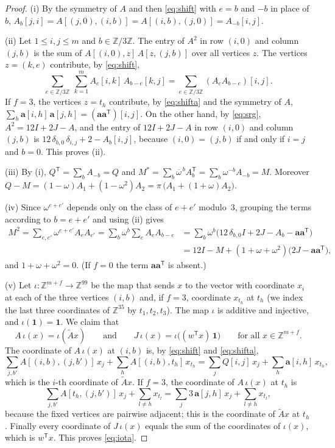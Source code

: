 \documentclass[11pt,a4paper]{article}
\theoremstyle{remark}
\newcommand{\ZZ}{\mathbb{Z}}
\newcommand{\one}{\mathbf{1}}
\newcommand{\tp}{\mathsf{T}}
\newcommand{\av}{\mathbf{a}}
\newcommand{\tA}{\widetilde{A}}
\begin{document}
\begin{proof}
(i) By the symmetry of $A$ and then \eqref{eq:shift} with $e=b$ and $-b$ in place of $b$,
$A_b[j,i]=A[(j,0),(i,b)]=A[(i,b),(j,0)]=A_{-b}[i,j]$.

(ii) Let $1\le i,j\le m$ and $b\in\ZZ/3\ZZ$. The entry of $A^2$ in row $(i,0)$ and column $(j,b)$ is the sum of
$A[(i,0),z]\,A[z,(j,b)]$ over all vertices $z$. The vertices $z=(k,e)$ contribute, by \eqref{eq:shift},
\[
\sum_{e\in\ZZ/3\ZZ}\ \sum_{k=1}^{m}A_e[i,k]\,A_{b-e}[k,j]=\sum_{e\in\ZZ/3\ZZ}(A_eA_{b-e})[i,j] .
\]
If $f=3$, the vertices $z=t_h$ contribute, by \eqref{eq:shifta} and the symmetry of $A$,
$\sum_{h}\av[i,h]\,\av[j,h]=(\av\av^{\tp})[i,j]$. On the other hand, by \eqref{eq:srg}, $A^2=12I+2J-A$, and the entry
of $12I+2J-A$ in row $(i,0)$ and column $(j,b)$ is $12\,\delta_{b,0}\,\delta_{i,j}+2-A_b[i,j]$, because
$(i,0)=(j,b)$ if and only if $i=j$ and $b=0$. This proves (ii).

(iii) By (i), $Q^{\tp}=\sum_bA_{-b}=Q$ and
$M^*=\sum_b\overline{\omega}^{\,b}A_b^{\tp}=\sum_b\omega^{-b}A_{-b}=M$. Moreover
$Q-M=(1-\omega)A_1+(1-\omega^2)A_2=\pi\,\bigl(A_1+(1+\omega)A_2\bigr)$.

(iv) Since $\omega^{e+e'}$ depends only on the class of $e+e'$ modulo~3, grouping the terms according to $b=e+e'$
and using (ii) gives
\begin{align*}
M^2=\sum_{e,e'}\omega^{e+e'}A_eA_{e'}=\sum_{b}\omega^{b}\sum_{e}A_eA_{b-e}
&=\sum_b\omega^b\bigl(12\,\delta_{b,0}I+2J-A_b-\av\av^{\tp}\bigr)\\
&=12I-M+(1+\omega+\omega^2)\bigl(2J-\av\av^{\tp}\bigr),
\end{align*}
and $1+\omega+\omega^2=0$. (If $f=0$ the term $\av\av^{\tp}$ is absent.)

(v) Let $\iota:\ZZ^{m+f}\to\ZZ^{99}$ be the map that sends $x$ to the vector with coordinate $x_i$ at each of the
three vertices $(i,b)$ and, if $f=3$, coordinate $x_{t_h}$ at $t_h$ (we index the last three coordinates of
$\ZZ^{35}$ by $t_1,t_2,t_3$). The map $\iota$ is additive and injective, and $\iota(\one)=\one$. We claim that
\begin{equation}\label{eq:iota}
A\,\iota(x)=\iota(\tA x)\qquad\text{and}\qquad J\,\iota(x)=\iota\bigl((w^{\tp}x)\,\one\bigr)
\qquad\text{for all }x\in\ZZ^{m+f}.
\end{equation}
The coordinate of $A\,\iota(x)$ at $(i,b)$ is, by \eqref{eq:shift} and \eqref{eq:shifta},
\[
\sum_{j,b'}A[(i,b),(j,b')]\,x_j+\sum_hA[(i,b),t_h]\,x_{t_h}=\sum_jQ[i,j]\,x_j+\sum_h\av[i,h]\,x_{t_h},
\]
which is the $i$-th coordinate of $\tA x$. If $f=3$, the coordinate of $A\,\iota(x)$ at $t_h$ is
\[
\sum_{j,b'}A[t_h,(j,b')]\,x_j+\sum_{l\ne h}x_{t_l}=\sum_j3\,\av[j,h]\,x_j+\sum_{l\ne h}x_{t_l},
\]
because the fixed vertices are pairwise adjacent; this is the coordinate of $\tA x$ at $t_h$. Finally every
coordinate of $J\,\iota(x)$ equals the sum of the coordinates of $\iota(x)$, which is $w^{\tp}x$. This proves
\eqref{eq:iota}.


\end{proof}
\end{document}
